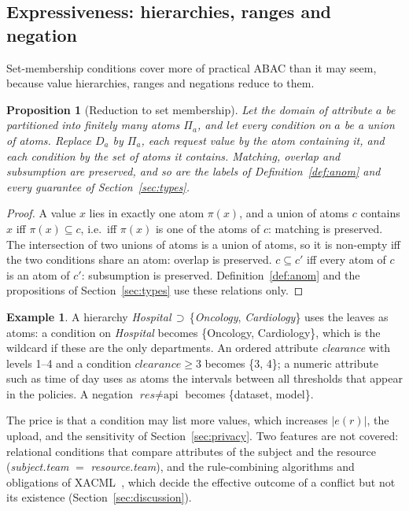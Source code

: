 \documentclass[preprint,12pt]{elsarticle}
\newtheorem{proposition}{Proposition}
\theoremstyle{definition}
\newtheorem{example}{Example}
\begin{document}
\subsection{Expressiveness: hierarchies, ranges and negation}
\label{sec:express}
Set-membership conditions cover more of practical ABAC than it may seem, because value hierarchies, ranges and negations reduce to them.
\begin{proposition}[Reduction to set membership]
\label{prop:reduce}
Let the domain of attribute $a$ be partitioned into finitely many \emph{atoms} $\Pi_a$, and let every condition on $a$ be a union of atoms. Replace $D_a$ by $\Pi_a$, each request value by the atom containing it, and each condition by the set of atoms it contains. Matching, overlap and subsumption are preserved, and so are the labels of Definition~\ref{def:anom} and every guarantee of Section~\ref{sec:types}.
\end{proposition}
\begin{proof}
A value $x$ lies in exactly one atom $\pi(x)$, and a union of atoms $c$ contains $x$ iff $\pi(x)\subseteq c$, i.e.\ iff $\pi(x)$ is one of the atoms of $c$: matching is preserved. The intersection of two unions of atoms is a union of atoms, so it is non-empty iff the two conditions share an atom: overlap is preserved. $c\subseteq c'$ iff every atom of $c$ is an atom of $c'$: subsumption is preserved. Definition~\ref{def:anom} and the propositions of Section~\ref{sec:types} use these relations only.
\end{proof}
\begin{example}
A hierarchy \emph{Hospital}$\,\supset\,$\{\emph{Oncology}, \emph{Cardiology}\} uses the leaves as atoms: a condition on \emph{Hospital} becomes \{Oncology, Cardiology\}, which is the wildcard if these are the only departments. An ordered attribute \textit{clearance} with levels 1--4 and a condition $\textit{clearance}\ge3$ becomes \{3, 4\}; a numeric attribute such as time of day uses as atoms the intervals between all thresholds that appear in the policies. A negation $\textit{res}\neq\text{api}$ becomes \{dataset, model\}.
\end{example}
The price is that a condition may list more values, which increases $|e(r)|$, the upload, and the sensitivity of Section~\ref{sec:privacy}. Two features are not covered: relational conditions that compare attributes of the subject and the resource (\textit{subject.team} $=$ \textit{resource.team}), and the rule-combining algorithms and obligations of XACML~\cite{oasis2013xacml}, which decide the effective outcome of a conflict but not its existence (Section~\ref{sec:discussion}).
\end{document}
